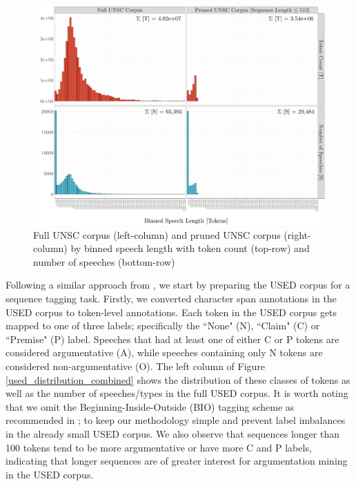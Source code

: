 \begin{figure}[b!]
    \centering
    \includegraphics[trim={1.0cm 0cm 0cm 0cm},clip,width=\textwidth]{img/token_dist_UNSC_length_combined.pdf}
    \caption{Full UNSC corpus (left-column) and pruned UNSC corpus (right-column) by binned speech length with token count (top-row) and number of speeches (bottom-row)}
    \label{unsc_distribution_combined}
\end{figure}

Following a similar approach from \citet{eger2017neural}, we start by preparing the USED corpus for a sequence tagging task. Firstly, we converted character span annotations in the USED corpus to token-level annotations. Each token in the USED corpus gets mapped to one of three labels; specifically the ``None" (N), ``Claim" (C) or ``Premise" (P) label. Speeches that had at least one of either C or P tokens are considered argumentative (A), while speeches containing only N tokens are considered non-argumentative (O). The left column of Figure \ref{used_distribution_combined} shows the distribution of these classes of tokens as well as the number of speeches/types in the full USED corpus. It is worth noting that we omit the Beginning-Inside-Outside (BIO) tagging scheme as recommended in \citet{eger2017neural}; to keep our methodology simple and prevent label imbalances in the already small USED corpus. We also observe that sequences longer than 100 tokens tend to be more argumentative or have more C and P labels, indicating that longer sequences are of greater interest for argumentation mining in the USED corpus.

